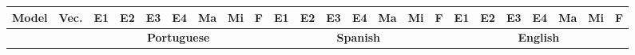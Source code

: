
\begin{landscape}
    \begin{table}[h]
    \setlength\tabcolsep{3pt}
    \small
    \centering

    \begin{tabular}{cl|lllllll|lllllll|lllllll}
    \hline

    \textbf{Model}                      & \textbf{Vec.}            & \textbf{E1}    & \textbf{E2}    & \textbf{E3}    & \textbf{E4}    & \textbf{Ma}    & \textbf{Mi}    & \textbf{F}     & \textbf{E1}    & \textbf{E2}    & \textbf{E3}    & \textbf{E4}    & \textbf{Ma}    & \textbf{Mi}    & \textbf{F}     & \textbf{E1}    & \textbf{E2}    & \textbf{E3}    & \textbf{E4}    & \textbf{Ma}    & \textbf{Mi}    & \textbf{F}     \\

    \hline
                               &                 & \multicolumn{7}{c|}{\textbf{Portuguese}}                        & \multicolumn{7}{c|}{\textbf{Spanish}}                           & \multicolumn{7}{c}{\textbf{English}}                           \\
    \hline


\end{tabular}
\end{table}
\end{landscape}
